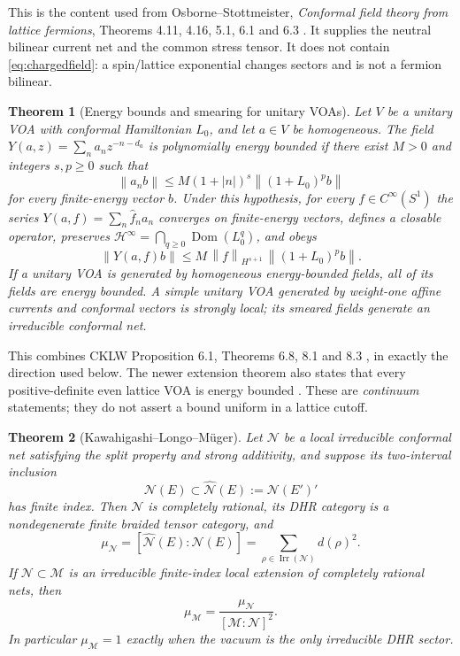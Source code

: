 \documentclass[11pt]{article}
\newtheorem{theorem}{Theorem}[section]
\theoremstyle{remark}
\newcommand{\Hh}{\mathcal H}
\newcommand{\norm}[1]{\left\lVert#1\right\rVert}
\begin{document}
This is the content used from Osborne--Stottmeister,
\emph{Conformal field theory from lattice fermions},
Theorems 4.11, 4.16, 5.1, 6.1 and 6.3
\cite{OsborneStottmeister}.  It supplies the neutral bilinear current net
and the common stress tensor.  It does not contain
\eqref{eq:chargedfield}: a spin/lattice exponential changes sectors and
is not a fermion bilinear.

\begin{theorem}[Energy bounds and smearing for unitary VOAs]
\label{thm:CKLWenergy}
Let $V$ be a unitary VOA with conformal Hamiltonian $L_0$, and let
$a\in V$ be homogeneous.  The field $Y(a,z)=\sum_na_nz^{-n-d_a}$
is polynomially energy bounded if there exist $M>0$ and integers
$s,p\ge0$ such that
\[
 \norm{a_n b}
 \le M(1+|n|)^s\norm{(1+L_0)^p b}
\tag{3.1}\label{eq:modebound}
\]
for every finite-energy vector $b$.  Under this hypothesis, for every
$f\in C^\infty(S^1)$ the series
$Y(a,f)=\sum_n\widehat f_n a_n$ converges on finite-energy vectors,
defines a closable operator, preserves
$\Hh^\infty=\bigcap_{q\ge0}\operatorname{Dom}(L_0^q)$, and obeys
\[
 \norm{Y(a,f)b}
 \le M\,\norm{f}_{H^{s+1}}\,
       \norm{(1+L_0)^p b}.
\tag{3.2}\label{eq:smearedbound}
\]
If a unitary VOA is generated by homogeneous energy-bounded fields, all
of its fields are energy bounded.  A simple unitary VOA generated by
weight-one affine currents and conformal vectors is strongly local; its
smeared fields generate an irreducible conformal net.
\end{theorem}

This combines CKLW Proposition 6.1, Theorems 6.8, 8.1 and 8.3
\cite{CKLW}, in exactly the direction used below.  The newer extension
theorem also states that every positive-definite even lattice VOA is
energy bounded \cite[Proposition 4.2]{CarpiTomassini}.  These are
\emph{continuum} statements; they do not assert a bound uniform in a
lattice cutoff.

\begin{theorem}[Kawahigashi--Longo--M\"uger]
\label{thm:KLM}
Let $\mathcal N$ be a local irreducible conformal net satisfying the split
property and strong additivity, and suppose its two-interval inclusion
\[
 \mathcal N(E)\subset\widehat{\mathcal N}(E)
 :=\mathcal N(E')'
\]
has finite index.  Then $\mathcal N$ is completely rational, its DHR
category is a nondegenerate finite braided tensor category, and
\[
 \mu_{\mathcal N}
 =[\widehat{\mathcal N}(E):\mathcal N(E)]
 =\sum_{\rho\in\operatorname{Irr}(\mathcal N)}d(\rho)^2.
\tag{3.3}\label{eq:KLMsum}
\]
If $\mathcal N\subset\mathcal M$ is an irreducible finite-index local
extension of completely rational nets, then
\[
 \mu_{\mathcal M}
 =\frac{\mu_{\mathcal N}}{[\mathcal M:\mathcal N]^2}.
\tag{3.4}\label{eq:KLMextension}
\]
In particular $\mu_{\mathcal M}=1$ exactly when the vacuum is the only
irreducible DHR sector.
\end{theorem}
\end{document}
